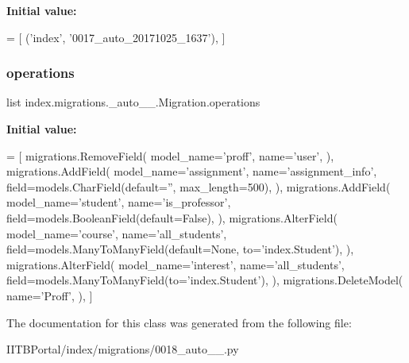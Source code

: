 {\bfseries Initial value\+:}
\begin{DoxyCode}
=  [
        (\textcolor{stringliteral}{'index'}, \textcolor{stringliteral}{'0017\_auto\_20171025\_1637'}),
    ]
\end{DoxyCode}
\mbox{\label{classindex_1_1migrations_1_10018__auto__20171025__1859_1_1Migration_aa169a0e85d5a2aafc3b6e7a1248584d4}} 
\subsubsection{\texorpdfstring{operations}{operations}}
{\footnotesize\ttfamily list index.\+migrations.\+\_\+auto\+\_\+\_.\+Migration.\+operations\hspace{0.3cm}{\ttfamily [static]}}

{\bfseries Initial value\+:}
\begin{DoxyCode}
=  [
        migrations.RemoveField(
            model\_name=\textcolor{stringliteral}{'proff'},
            name=\textcolor{stringliteral}{'user'},
        ),
        migrations.AddField(
            model\_name=\textcolor{stringliteral}{'assignment'},
            name=\textcolor{stringliteral}{'assignment\_info'},
            field=models.CharField(default=\textcolor{stringliteral}{''}, max\_length=500),
        ),
        migrations.AddField(
            model\_name=\textcolor{stringliteral}{'student'},
            name=\textcolor{stringliteral}{'is\_professor'},
            field=models.BooleanField(default=\textcolor{keyword}{False}),
        ),
        migrations.AlterField(
            model\_name=\textcolor{stringliteral}{'course'},
            name=\textcolor{stringliteral}{'all\_students'},
            field=models.ManyToManyField(default=\textcolor{keywordtype}{None}, to=\textcolor{stringliteral}{'index.Student'}),
        ),
        migrations.AlterField(
            model\_name=\textcolor{stringliteral}{'interest'},
            name=\textcolor{stringliteral}{'all\_students'},
            field=models.ManyToManyField(to=\textcolor{stringliteral}{'index.Student'}),
        ),
        migrations.DeleteModel(
            name=\textcolor{stringliteral}{'Proff'},
        ),
    ]
\end{DoxyCode}


The documentation for this class was generated from the following file\+:\begin{DoxyCompactItemize}
\item 
I\+I\+T\+B\+Portal/index/migrations/0018\+\_\+auto\+\_\+\_.\+py\end{DoxyCompactItemize}
